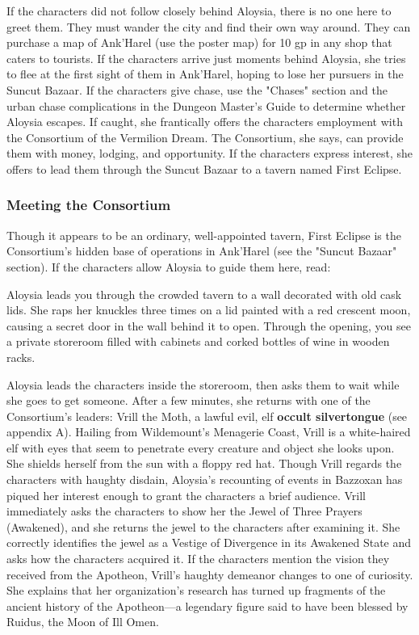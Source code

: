 \documentclass[10pt,a4,twoside,twocolumn,openany,nodeprecatedcode]{dndbook}
\begin{document}
If the characters did not follow closely behind Aloysia, there is no one here to greet them. They must wander the city and find their own way around. They can purchase a map of Ank'Harel (use the poster map) for 10 gp in any shop that caters to tourists.
If the characters arrive just moments behind Aloysia, she tries to flee at the first sight of them in Ank'Harel, hoping to lose her pursuers in the Suncut Bazaar. If the characters give chase, use the "Chases" section and the urban chase complications in the Dungeon Master's Guide to determine whether Aloysia escapes. If caught, she frantically offers the characters employment with the Consortium of the Vermilion Dream. The Consortium, she says, can provide them with money, lodging, and opportunity. If the characters express interest, she offers to lead them through the Suncut Bazaar to a tavern named First Eclipse.
\subsubsection{Meeting the Consortium}
Though it appears to be an ordinary, well-appointed tavern, First Eclipse is the Consortium's hidden base of operations in Ank'Harel (see the "Suncut Bazaar" section). If the characters allow Aloysia to guide them here, read:
\begin{DndReadAloud}{}
Aloysia leads you through the crowded tavern to a wall decorated with old cask lids. She raps her knuckles three times on a lid painted with a red crescent moon, causing a secret door in the wall behind it to open. Through the opening, you see a private storeroom filled with cabinets and corked bottles of wine in wooden racks.
\end{DndReadAloud}

Aloysia leads the characters inside the storeroom, then asks them to wait while she goes to get someone. After a few minutes, she returns with one of the Consortium's leaders: Vrill the Moth, a lawful evil, elf \textbf{occult silvertongue} (see appendix A).
Hailing from Wildemount's Menagerie Coast, Vrill is a white-haired elf with eyes that seem to penetrate every creature and object she looks upon. She shields herself from the sun with a floppy red hat. Though Vrill regards the characters with haughty disdain, Aloysia's recounting of events in Bazzoxan has piqued her interest enough to grant the characters a brief audience.
Vrill immediately asks the characters to show her the Jewel of Three Prayers (Awakened), and she returns the jewel to the characters after examining it. She correctly identifies the jewel as a Vestige of Divergence in its Awakened State and asks how the characters acquired it.
If the characters mention the vision they received from the Apotheon, Vrill's haughty demeanor changes to one of curiosity. She explains that her organization's research has turned up fragments of the ancient history of the Apotheon—a legendary figure said to have been blessed by Ruidus, the Moon of Ill Omen.
\end{document}
